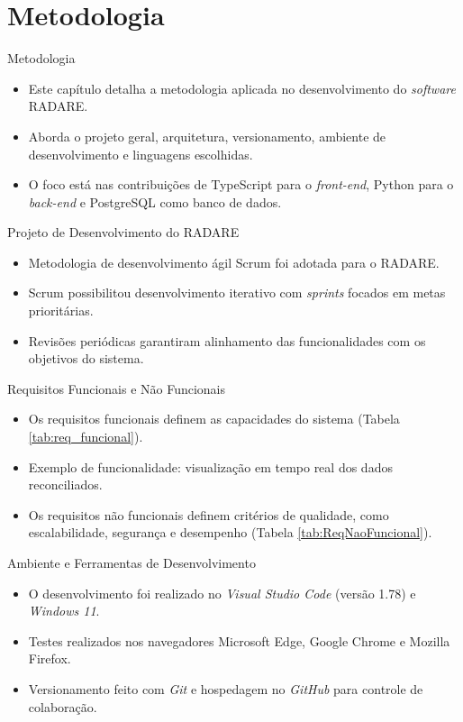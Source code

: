 \section{Metodologia}

\begin{frame}{Metodologia}
    \begin{itemize}
        \item Este capítulo detalha a metodologia aplicada no desenvolvimento do \textit{software} RADARE.
        \item Aborda o projeto geral, arquitetura, versionamento, ambiente de desenvolvimento e linguagens escolhidas.
        \item O foco está nas contribuições de TypeScript para o \textit{front-end}, Python para o \textit{back-end} e PostgreSQL como banco de dados.
    \end{itemize}
\end{frame}

\begin{frame}{Projeto de Desenvolvimento do RADARE}
    \begin{itemize}
        \item Metodologia de desenvolvimento ágil Scrum foi adotada para o RADARE.
        \item Scrum possibilitou desenvolvimento iterativo com \textit{sprints} focados em metas prioritárias.
        \item Revisões periódicas garantiram alinhamento das funcionalidades com os objetivos do sistema.
    \end{itemize}
\end{frame}

\begin{frame}{Requisitos Funcionais e Não Funcionais}
    \begin{itemize}
        \item Os requisitos funcionais definem as capacidades do sistema (Tabela \ref{tab:req_funcional}).
        \item Exemplo de funcionalidade: visualização em tempo real dos dados reconciliados.
        \item Os requisitos não funcionais definem critérios de qualidade, como escalabilidade, segurança e desempenho (Tabela \ref{tab:ReqNaoFuncional}).
    \end{itemize}
\end{frame}

\begin{frame}{Ambiente e Ferramentas de Desenvolvimento}
    \begin{itemize}
        \item O desenvolvimento foi realizado no \textit{Visual Studio Code} (versão 1.78) e \textit{Windows 11}.
        \item Testes realizados nos navegadores Microsoft Edge, Google Chrome e Mozilla Firefox.
        \item Versionamento feito com \textit{Git} e hospedagem no \textit{GitHub} para controle de colaboração.
    \end{itemize}
\end{frame}

